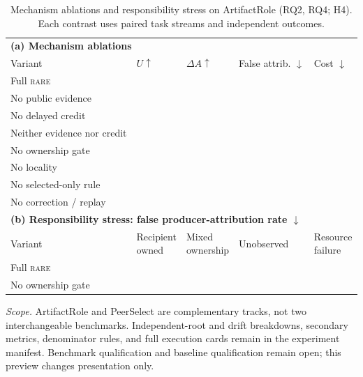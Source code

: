 \documentclass[sigconf,anonymous]{aamas}
\newcommand{\blank}{\textemdash}
\newcommand{\rare}{\textsc{rare}}
\newcommand{\metric}[1]{\makecell[c]{#1}}
\begin{document}
\begin{table}[!ht]
\centering
\small
\setlength{\tabcolsep}{4pt}
\renewcommand{\arraystretch}{1.10}
\begin{tabular}{@{}l*{4}{>{\centering\arraybackslash}p{}}@{}}
\toprule
\multicolumn{5}{l}{\textbf{(a) Mechanism ablations}}\\
Variant & $U\uparrow$ & $\Delta A\uparrow$ & \metric{False attrib.\\$\downarrow$} & Cost $\downarrow$\\
\midrule
Full \rare{} & \blank & \blank & \blank & \blank\\
No public evidence & \blank & \blank & \blank & \blank\\
No delayed credit & \blank & \blank & \blank & \blank\\
Neither evidence nor credit & \blank & \blank & \blank & \blank\\
No ownership gate & \blank & \blank & \blank & \blank\\
No locality & \blank & \blank & \blank & \blank\\
No selected-only rule & \blank & \blank & \blank & \blank\\
No correction / replay & \blank & \blank & \blank & \blank\\
\midrule
\multicolumn{5}{l}{\textbf{(b) Responsibility stress: false producer-attribution rate $\downarrow$}}\\
Variant & \metric{Recipient\\owned} & \metric{Mixed\\ownership} & Unobserved & \metric{Resource\\failure}\\
\midrule
Full \rare{} & \blank & \blank & \blank & \blank\\
No ownership gate & \blank & \blank & \blank & \blank\\
\bottomrule
\end{tabular}
\caption{Mechanism ablations and responsibility stress on ArtifactRole (RQ2, RQ4; H4). Each contrast uses paired task streams and independent outcomes.}
\label{tab:body-safety-ablation}
\end{table}

\noindent\footnotesize\textit{Scope.} ArtifactRole and PeerSelect are complementary
tracks, not two interchangeable benchmarks. Independent-root and drift breakdowns,
secondary metrics, denominator rules, and full execution cards remain in the
experiment manifest. Benchmark qualification and baseline qualification remain
open; this preview changes presentation only.
\end{document}
